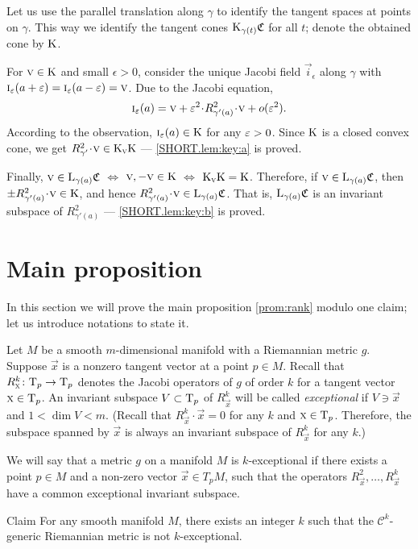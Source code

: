 \documentclass[a4paper,10pt]{article}
\begin{document}
Let us use the parallel translation along $\gamma$ to identify the tangent spaces at points on $\gamma$.
This way we identify the tangent cones $\mathrm{K}_{\gamma(t)}\mathfrak{C}$ for all $t$;
denote the obtained cone by $\mathrm{K}$.

For $\text{\sc{v}}\in \mathrm{K}$ and small $\epsilon>0$, consider the unique Jacobi field $\vec i_\epsilon$ along $\gamma$ with $\vec i_\epsilon (a+\eps)\z=\vec i _\epsilon(a-\eps)=\vec{v}$.
Due to the Jacobi equation,
\[\vec i_\epsilon (a)=\vec{v} +\eps^2\cdot R^2_{\gamma'(a)}\cdot \vec{v} +o(\eps^2).\]
According to the observation, $\text{\sc{i}}_\varepsilon(a)\in \mathrm{K}$ for any $\varepsilon>0$.
Since $\mathrm{K}$ is a closed convex cone, we get $R^2_{\gamma'}\cdot \vec{v}\z\in \K_\vec{v}\K$ --- \ref{SHORT.lem:key:a} is proved.

Finally,
$\text{\sc{v}}\in \mathrm{L}_{\gamma(a)}\mathfrak{C}$ $
\iff$
$\text{\sc{v}}, -\text{\sc{v}}\in \mathrm{K}$
$\iff$
$\mathrm{K}_{\text{\sc{v}}}\mathrm{K}=\mathrm{K}$.
Therefore, if $\text{\sc{v}}\in \mathrm{L}_{\gamma(a)}\mathfrak{C}$, then $\pm R^2_{\gamma'(a)}\cdot \vec{v}\in \K$, and hence $R^2_{\gamma'(a)}\cdot \vec{v}\in \L_{\gamma(a)}\mathfrak{C}$.
That is, $\mathrm{L}_{\gamma(a)}\mathfrak{C}$ is an invariant subspace of $R^2_{\gamma'(a)}$ --- \ref{SHORT.lem:key:b} is proved.
\qeds

\section{Main proposition}

In this section we will prove the main proposition \ref{prom:rank} modulo one claim; let us introduce notations to state it.

Let $M$ be a smooth $m$-dimensional manifold with a Riemannian metric $g$.
Suppose $\vec x$ is a nonzero tangent vector at a point $p\in M$.
Recall that $R^k_\vec x\:\T_p\z\to\T_p$ denotes the Jacobi operators of $g$ of order $k$ for a tangent vector $\text{\sc{x}}\in\mathrm{T}_p$.
An invariant subspace $V\subset \mathrm{T}_p$ of $R^k_\vec x$ will be called \emph{exceptional} if $V\ni \vec x$ and $1< \dim V<m$.
(Recall that $R^k_\vec x\cdot \vec x=0$
for any $k$ and $\text{\sc{x}}\in \mathrm{T}_p$.
Therefore, the subspace spanned by $\vec x$ is always an invariant subspace of $R^k_\vec x$ for any $k$.)

We will  say that a metric $g$ on a manifold $M$ is $k$-exceptional if there exists a point $p\in M$ and a non-zero vector $\vec x\in T_p M$,
such that the operators   $R^2_\vec x,\dots, R^k _\vec x$ have a common exceptional invariant subspace.  

\begin{thm}{Claim}\label{clm:codim-sigma} 
For any smooth manifold $M$, there exists an integer $k$ such that the 
$\mathcal C^k$-generic Riemannian metric is not $k$-exceptional.
\end{thm}
\end{document}
